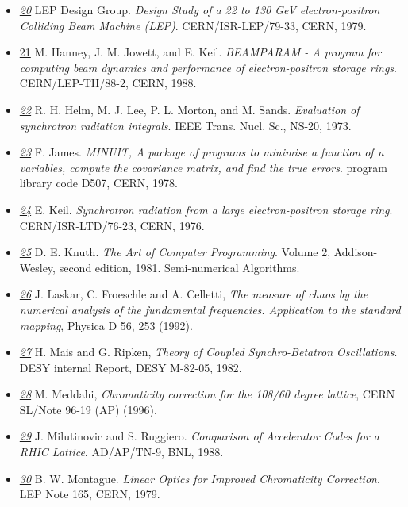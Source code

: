 \begin{itemize}
	\item \href{lep}{\textit{20}} LEP Design Group. \textit{Design Study of a 22 to 130 GeV electron-positron Colliding Beam Machine   (LEP)}. CERN/ISR-LEP/79-33, CERN, 1979. 


	\item \href{beamparam<i}{21} M. Hanney, J. M. Jowett, and E. Keil. \textit{BEAMPARAM - A program for computing beam dynamics and   performance of electron-positron storage rings}. CERN/LEP-TH/88-2, CERN, 1988. 


	\item \href{helm}{\textit{22}} R. H. Helm, M. J. Lee, P. L. Morton, and M. Sands. \textit{Evaluation of synchrotron radiation integrals}. IEEE Trans. Nucl. Sc., NS-20, 1973. 


	\item \href{minuit}{\textit{23}} F. James. \textit{MINUIT, A package of programs to minimise a function of n   variables, compute the covariance matrix, and find the true errors}. program library code D507, CERN, 1978. 


	\item \href{keil}{\textit{24}} E. Keil. \textit{Synchrotron radiation from a large electron-positron storage ring}. CERN/ISR-LTD/76-23, CERN, 1976. 


	\item \href{knuth}{\textit{25}} D. E. Knuth. \textit{The Art of Computer Programming}. Volume 2, Addison-Wesley, second edition, 1981. Semi-numerical Algorithms. 


	\item \href{laskar}{\textit{26}} J. Laskar, C. Froeschle and A. Celletti, \textit{The measure of chaos by the numerical analysis of the fundamental   frequencies. Application to the standard mapping}, Physica D 56, 253 (1992). 


	\item \href{mais}{\textit{27}} H. Mais and G. Ripken, \textit{Theory of Coupled Synchro-Betatron Oscillations}. DESY internal Report, DESY M-82-05, 1982. 


	\item \href{malika}{\textit{28}} M. Meddahi, \textit{Chromaticity correction for the 108/60 degree lattice}, CERN SL/Note 96-19 (AP) (1996). 


	\item \href{ruggiero}{\textit{29}} J. Milutinovic and S. Ruggiero. \textit{Comparison of Accelerator Codes for a RHIC Lattice}. AD/AP/TN-9, BNL, 1988. 


	\item \href{montague}{\textit{30}} B. W. Montague. \textit{Linear Optics for Improved Chromaticity Correction}. LEP Note 165, CERN, 1979. 



\end{itemize}
